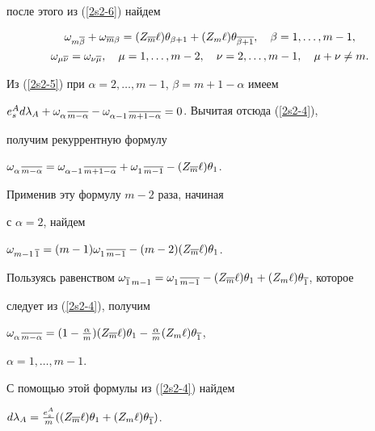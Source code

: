 после этого из (\ref{2s2-6}) найдем


\begin{gather}\label{*1}


\omega_{m\ol\beta}+ \omega_{\ol m \beta} = (Z_{\ol m}\ell)


\theta_{\beta+1} + (Z_{m}\ell) \theta_{\ol{\beta+1}},


\quad \beta=1,\dotsc,m-1,\\


%


\label{*2}


\omega_{\mu\ol\nu}= \omega_{\nu\ol\mu}, \quad \mu = 1,\dotsc,m-2,


\quad \nu=2,\dotsc,m-1,\quad \mu+\nu \neq m.


\end{gather}


Из (\ref{2s2-5}) при $\alpha=2,\dotsc,m-1$, $\beta=m+1-\alpha$ имеем


$e^{A}_s d\lambda_{A} + \omega_{\alpha \, \ol{m-\alpha}} -


\omega_{\alpha-1 \, \ol{m+1-\alpha}} = 0$. Вычитая отсюда (\ref{2s2-4}),


получим рекуррентную формулу


$\omega_{\alpha \, \ol{m-\alpha}} = \omega_{\alpha-1 \, \ol{m+1-\alpha}}


+ \omega_{1\, \ol{m-1}} - (Z_{\ol m} \ell) \theta_1$.


Применив эту формулу $m-2$ раза, начиная


с $\alpha=2$, найдем


$\omega_{m-1 \, \ol 1} = (m-1)\omega_{1\, \ol{m-1}}- (m-2) (Z_{\ol m}


\ell) \theta_1$.


Пользуясь равенством $\omega_{\ol 1 \, m-1} = \omega_{1 \, \ol{m-1}} -


(Z_{\ol m} \ell) \theta_1 + (Z_{m} \ell) \theta_{\ol 1}$, которое


следует из (\ref{2s2-4}), получим


$\omega_{\alpha\, \ol{m-\alpha}} = (1-\frac{\alpha}{m})


(Z_{\ol m}\ell)\theta_1 - \frac{\alpha}{m}(Z_m \ell)\theta_{\ol 1}$,


$\alpha=1,\dotsc,m-1$.


С помощью этой формулы из (\ref{2s2-4}) найдем


$d\lambda_A = \frac{e^A_s}{m}((Z_{\ol m}\ell)\theta_1 +


(Z_m\ell)\theta_{\ol 1})$.


